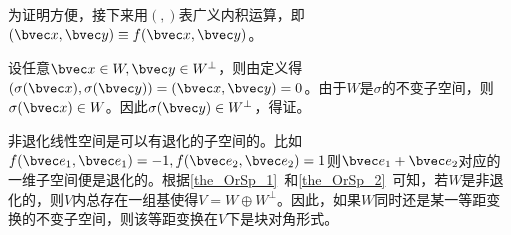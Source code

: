 为证明方便，接下来用$(,)$表广义内积运算，即$(\bvec  x,\bvec y)\equiv f( \bvec x,\bvec  y) $。

设任意$\bvec x\in W,\bvec y\in W^{\bot}$，则由定义得$(\sigma (\bvec x),\sigma(\bvec y))=(\bvec x,\bvec y)=0$。由于$W$是$\sigma$的不变子空间，则$\sigma (\bvec x)\in W$。因此$\sigma(\bvec y)\in W^{\bot}$，得证。


非退化线性空间是可以有退化的子空间的。比如$f(\bvec e_1,\bvec e_1)=-1,f(\bvec e_2,\bvec e_2)=1$则$\bvec e_1+\bvec e_2$对应的一维子空间便是退化的。根据\autoref{the_OrSp_1}~和\autoref{the_OrSp_2}~可知，若$W$是非退化的，则$V$内总存在一组基使得$V=W\oplus W^{\bot}$。因此，如果$W$同时还是某一等距变换的不变子空间，则该等距变换在$V$下是块对角形式。


